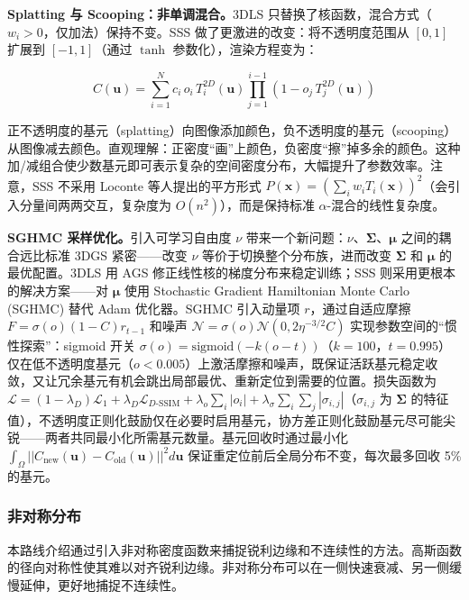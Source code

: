 \textbf{Splatting 与 Scooping：非单调混合。}3DLS 只替换了核函数，混合方式（$w_i > 0$，仅加法）保持不变。SSS 做了更激进的改变：将不透明度范围从 $[0, 1]$ 扩展到 $[-1, 1]$（通过 $\tanh$ 参数化），渲染方程变为：

\begin{equation}
C(\mathbf{u}) = \sum_{i=1}^N c_i \, o_i \, T^{2D}_i(\mathbf{u}) \prod_{j=1}^{i-1}(1 - o_j \, T^{2D}_j(\mathbf{u}))
\end{equation}

正不透明度的基元（splatting）向图像添加颜色，负不透明度的基元（scooping）从图像减去颜色。直观理解：正密度``画''上颜色，负密度``擦''掉多余的颜色。这种加/减组合使少数基元即可表示复杂的空间密度分布，大幅提升了参数效率。注意，SSS 不采用 Loconte 等人提出的平方形式 $P(\mathbf{x}) = (\sum_i w_i T_i(\mathbf{x}))^2$（会引入分量间两两交互，复杂度为 $O(n^2)$），而是保持标准 $\alpha$-混合的线性复杂度。

\textbf{SGHMC 采样优化。}引入可学习自由度 $\nu$ 带来一个新问题：$\nu$、$\boldsymbol{\Sigma}$、$\boldsymbol{\mu}$ 之间的耦合远比标准 3DGS 紧密——改变 $\nu$ 等价于切换整个分布族，进而改变 $\boldsymbol{\Sigma}$ 和 $\boldsymbol{\mu}$ 的最优配置。3DLS 用 AGS 修正线性核的梯度分布来稳定训练；SSS 则采用更根本的解决方案——对 $\boldsymbol{\mu}$ 使用 Stochastic Gradient Hamiltonian Monte Carlo (SGHMC) 替代 Adam 优化器。SGHMC 引入动量项 $r$，通过自适应摩擦 $F = \sigma(o)(1-C)r_{t-1}$ 和噪声 $\mathcal{N} = \sigma(o)\mathcal{N}(0, 2\eta^{-3/2}C)$ 实现参数空间的``惯性探索''：sigmoid 开关 $\sigma(o) = \text{sigmoid}(-k(o - t))$（$k=100$，$t=0.995$）仅在低不透明度基元（$o < 0.005$）上激活摩擦和噪声，既保证活跃基元稳定收敛，又让冗余基元有机会跳出局部最优、重新定位到需要的位置。损失函数为 $\mathcal{L} = (1-\lambda_D)\mathcal{L}_1 + \lambda_D\mathcal{L}_{D\text{-SSIM}} + \lambda_o \sum_i |o_i| + \lambda_\sigma \sum_i \sum_j |\sigma_{i,j}|$（$\sigma_{i,j}$ 为 $\boldsymbol{\Sigma}$ 的特征值），不透明度正则化鼓励仅在必要时启用基元，协方差正则化鼓励基元尽可能尖锐——两者共同最小化所需基元数量。基元回收时通过最小化 $\int_{\Omega} ||C_{\text{new}}(\mathbf{u}) - C_{\text{old}}(\mathbf{u})||^2 d\mathbf{u}$ 保证重定位前后全局分布不变，每次最多回收 5\% 的基元。

\subsubsection{非对称分布}

本路线介绍通过引入非对称密度函数来捕捉锐利边缘和不连续性的方法。高斯函数的径向对称性使其难以对齐锐利边缘。非对称分布可以在一侧快速衰减、另一侧缓慢延伸，更好地捕捉不连续性。

